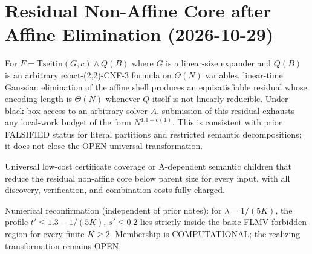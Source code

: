 
\section{Residual Non-Affine Core after Affine Elimination (2026-10-29)}
\begin{remark}
For \(F = \mathrm{Tseitin}(G,c) \land Q(B)\) where \(G\) is a linear-size expander and \(Q(B)\) is an arbitrary exact-(2,2)-CNF-3 formula on \(\Theta(N)\) variables, linear-time Gaussian elimination of the affine shell produces an equisatisfiable residual whose encoding length is \(\Theta(N)\) whenever \(Q\) itself is not linearly reducible. Under black-box access to an arbitrary solver \(A\), submission of this residual exhausts any local-work budget of the form \(N^{1.1+o(1)}\). This is consistent with prior FALSIFIED status for literal partitions and restricted semantic decompositions; it does not close the OPEN universal transformation.
\end{remark}

\begin{open}
Universal low-cost certificate coverage or A-dependent semantic children that reduce the residual non-affine core below parent size for every input, with all discovery, verification, and combination costs fully charged.
\end{open}

Numerical reconfirmation (independent of prior notes): for \(\lambda=1/(5K)\), the profile \(t'\le 1.3-1/(5K)\), \(s'\le 0.2\) lies strictly inside the basic FLMV forbidden region for every finite \(K\ge 2\). Membership is COMPUTATIONAL; the realizing transformation remains OPEN.
